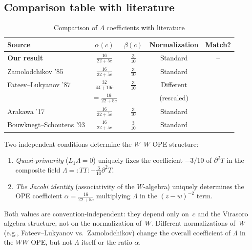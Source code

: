 \subsection{Comparison table with literature}
\label{subsec:literature-comparison-table}

\begin{table}[ht]
\centering
\caption{Comparison of $\Lambda$ coefficients with literature}
\label{tab:lambda-comparison}
\begin{tabular}{|l|c|c|c|c|}
\hline
\textbf{Source} & \textbf{$\alpha(c)$} & \textbf{$\beta(c)$} & \textbf{Normalization} & 
\textbf{Match?} \\
\hline
\textbf{Our result} & $\frac{16}{22+5c}$ & $\frac{3}{10}$ & Standard & -- \\
\hline
Zamolodchikov '85 & $\frac{16}{22+5c}$ & $\frac{3}{10}$ & Standard & \\
\hline
Fateev--Lukyanov '87 & $\frac{32}{44+10c}$ & $\frac{3}{10}$ & Different & \\
& $= \frac{16}{22+5c}$ & & (rescaled) & \\
\hline
Arakawa '17 & $\frac{16}{22+5c}$ & $\frac{3}{10}$ & Standard & \\
\hline
Bouwknegt--Schoutens '93 & $\frac{16}{22+5c}$ & $\frac{3}{10}$ & Standard & \\
\hline
\end{tabular}
\end{table}

\begin{remark}\label{rem:FL-normalization}
Two independent conditions determine the $W$--$W$ OPE structure:
\begin{enumerate}
\item \emph{Quasi-primarity} ($L_1 \Lambda = 0$) uniquely fixes the coefficient $-3/10$ of $\partial^2 T$ in the composite field $\Lambda = {:}TT{:} - \tfrac{3}{10}\partial^2 T$.
\item \emph{The Jacobi identity} (associativity of the $W$-algebra) uniquely determines the OPE coefficient $\alpha = \frac{16}{22+5c}$ multiplying $\Lambda$ in the $(z-w)^{-2}$ term.
\end{enumerate}
Both values are convention-independent: they depend only on~$c$ and the Virasoro algebra structure, not on the normalization of~$W$.
Different normalizations of~$W$ (e.g., Fateev--Lukyanov vs.\ Zamolodchikov) change the
overall coefficient of $\Lambda$ in the $WW$ OPE, but not $\Lambda$ itself or the ratio $\alpha$.
\end{remark}

